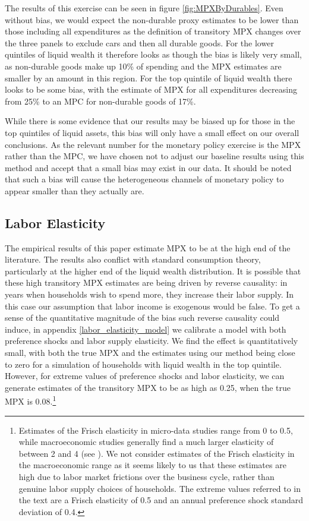 \documentclass[titlepage]{\econtex}\newcommand{\texname}{ConsumptionHeterogeneity}
\begin{document}
The results of this exercise can be seen in figure \ref{fig:MPXByDurables}. Even without bias, we would expect the non-durable proxy estimates to be lower than those including all expenditures as the definition of transitory MPX changes over the three panels to exclude cars and then all durable goods. For the lower quintiles of liquid wealth it therefore looks as though the bias is likely very small, as non-durable goods make up 10\% of spending and the MPX estimates are smaller by an amount in this region. For the top quintile of liquid wealth there looks to be some bias, with the estimate of MPX for all expenditures decreasing from 25\% to an MPC for non-durable goods of 17\%.

While there is some evidence that our results may be biased up for those in the top quintiles of liquid assets, this bias will only have a small effect on our overall conclusions. As the relevant number for the monetary policy exercise is the MPX rather than the MPC, we have chosen not to adjust our baseline results using this method and accept that a small bias may exist in our data. It should be noted that such a bias will cause the heterogeneous channels of monetary policy to appear smaller than they actually are.

\subsection{Labor Elasticity} \label{labor_elasticity}
The empirical results of this paper estimate MPX to be at the high end of the literature. The results also conflict with standard consumption theory, particularly at the higher end of the liquid wealth distribution. It is possible that these high transitory MPX estimates are being driven by reverse causality: in years when households wish to spend more, they increase their labor supply. In this case our assumption that labor income is exogenous would be false. To get a sense of the quantitative magnitude of the bias such reverse causality could induce, in appendix \ref{labor_elasticity_model} we calibrate a model with both preference shocks and labor supply elasticity. We find the effect is quantitatively small, with both the true MPX and the estimates using our method being close to zero for a simulation of households with liquid wealth in the top quintile. However, for extreme values of preference shocks and labor elasticity, we can generate estimates of the transitory MPX to be as high as 0.25, when the true MPX is 0.08.\footnote{Estimates of the Frisch elasticity in micro-data studies range from 0 to 0.5, while macroeconomic studies generally find a much larger elasticity of between 2 and 4 (see \cite{peterman_reconciling_2016}). We not consider estimates of the Frisch elasticity in the macroeconomic range as it seems likely to us that these estimates are high due to labor market frictions over the business cycle, rather than genuine labor supply choices of households. The extreme values referred to in the text are a Frisch elasticity of 0.5 and an annual preference shock standard deviation of 0.4.}
\end{document}
